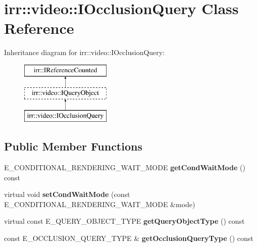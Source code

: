 \hypertarget{classirr_1_1video_1_1IOcclusionQuery}{}\section{irr\+:\+:video\+:\+:I\+Occlusion\+Query Class Reference}
\label{classirr_1_1video_1_1IOcclusionQuery}
Inheritance diagram for irr\+:\+:video\+:\+:I\+Occlusion\+Query\+:\begin{figure}[H]
\begin{center}
\leavevmode
\includegraphics[height=3.000000cm]{classirr_1_1video_1_1IOcclusionQuery}
\end{center}
\end{figure}
\subsection*{Public Member Functions}
\begin{DoxyCompactItemize}
\item 
E\+\_\+\+C\+O\+N\+D\+I\+T\+I\+O\+N\+A\+L\+\_\+\+R\+E\+N\+D\+E\+R\+I\+N\+G\+\_\+\+W\+A\+I\+T\+\_\+\+M\+O\+DE {\bfseries get\+Cond\+Wait\+Mode} () const \hypertarget{classirr_1_1video_1_1IOcclusionQuery_a11dca98cd885a473c1286bc3f12dc07e}{}\label{classirr_1_1video_1_1IOcclusionQuery_a11dca98cd885a473c1286bc3f12dc07e}

\item 
virtual void {\bfseries set\+Cond\+Wait\+Mode} (const E\+\_\+\+C\+O\+N\+D\+I\+T\+I\+O\+N\+A\+L\+\_\+\+R\+E\+N\+D\+E\+R\+I\+N\+G\+\_\+\+W\+A\+I\+T\+\_\+\+M\+O\+DE \&mode)\hypertarget{classirr_1_1video_1_1IOcclusionQuery_a50bb0fb79825c6814814c4ec8265437d}{}\label{classirr_1_1video_1_1IOcclusionQuery_a50bb0fb79825c6814814c4ec8265437d}

\item 
virtual const E\+\_\+\+Q\+U\+E\+R\+Y\+\_\+\+O\+B\+J\+E\+C\+T\+\_\+\+T\+Y\+PE {\bfseries get\+Query\+Object\+Type} () const \hypertarget{classirr_1_1video_1_1IOcclusionQuery_a8e289150dc5169457d00f2f61faae58f}{}\label{classirr_1_1video_1_1IOcclusionQuery_a8e289150dc5169457d00f2f61faae58f}

\item 
const E\+\_\+\+O\+C\+C\+L\+U\+S\+I\+O\+N\+\_\+\+Q\+U\+E\+R\+Y\+\_\+\+T\+Y\+PE \& {\bfseries get\+Occlusion\+Query\+Type} () const \hypertarget{classirr_1_1video_1_1IOcclusionQuery_a611dfaa0102f4794d48ef4b901cde63a}{}\label{classirr_1_1video_1_1IOcclusionQuery_a611dfaa0102f4794d48ef4b901cde63a}

\end{DoxyCompactItemize}
